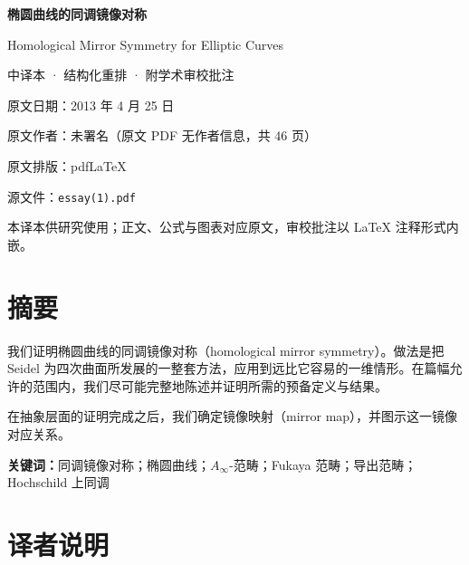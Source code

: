 \documentclass[11pt,a4paper,UTF8]{article}
\begin{document}
\begin{titlepage}
  \centering
  \vspace*{3.2cm}
  {\LARGE\bfseries 椭圆曲线的同调镜像对称\par}
  \vspace{0.8cm}
  {\large Homological Mirror Symmetry for Elliptic Curves\par}
  \vspace{1.2cm}
  {\normalsize 中译本 · 结构化重排 · 附学术审校批注\par}
  \vspace{2.4cm}
  {\normalsize
   原文日期：2013 年 4 月 25 日\par\vspace{4pt}
   原文作者：未署名（原文 PDF 无作者信息，共 46 页）\par\vspace{4pt}
   原文排版：pdf\LaTeX\par\vspace{4pt}
   源文件：\texttt{essay(1).pdf}\par}
  \vfill
  {\small 本译本供研究使用；正文、公式与图表对应原文，审校批注以 \LaTeX{} 注释形式内嵌。\par}
\end{titlepage}


\section*{摘要}

我们证明椭圆曲线的同调镜像对称（homological mirror symmetry）。做法是把 Seidel 为四次曲面所发展的一整套方法，应用到远比它容易的一维情形。在篇幅允许的范围内，我们尽可能完整地陈述并证明所需的预备定义与结果。

在抽象层面的证明完成之后，我们确定镜像映射（mirror map），并图示这一镜像对应关系。

\medskip
\noindent\textbf{关键词：}同调镜像对称；椭圆曲线；$A_\infty$-范畴；Fukaya 范畴；导出范畴；Hochschild 上同调

\section*{译者说明}
\end{document}
